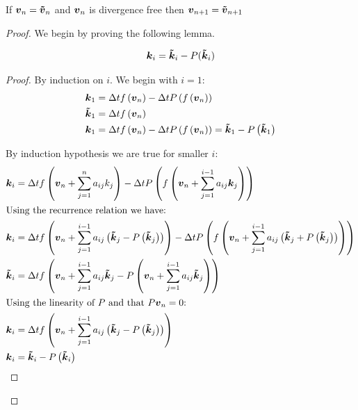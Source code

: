 \begin{theorem}
If ${\boldsymbol {v}}_{n}={\boldsymbol {\tilde{v}}}_{n}$ and ${\boldsymbol {v}}_n$ is divergence free then ${\boldsymbol {v}}_{n+1}={\boldsymbol {\tilde{v}}}_{n+1}$ 
\end{theorem}
\begin{proof}
We begin by proving the following lemma.
\begin{lemma}
\begin{equation}
  {\boldsymbol {k}}_{i}={\boldsymbol {\tilde{k}}}_{i}-P({\boldsymbol {\tilde{k}}}_{i})
\end{equation}
\end{lemma}
\begin{proof}
By induction on $i$.
We begin with $i=1$:
\begin{align}
  {\boldsymbol {k}}_{1}&=\Delta tf\left({\boldsymbol {v}}_n\right)-\Delta tP\left(f\left({\boldsymbol {v}}_n\right)\right)\\
{\boldsymbol {\tilde{k}}}_{1}&=\Delta tf\left({\boldsymbol {v}}_n\right)\\
  {\boldsymbol {k}}_{1}&=\Delta t f\left({\boldsymbol {v}}_n\right)-\Delta tP\left(f\left({\boldsymbol {v}}_n\right)\right)={\boldsymbol {\tilde{k}}}_1-P\left({\boldsymbol {\tilde{k}}}_1\right)
\end{align}

By induction hypothesis we are true for smaller $i$:
\begin{align*}
  {\boldsymbol {k}}_{i}&=\Delta tf\left({\boldsymbol {v}}_n+\sum_{j=1}^{n}a_{ij}k_{j}\right)-\Delta tP\left(f\left({\boldsymbol {v}}_n+\sum_{j=1}^{i-1}a_{ij}{\boldsymbol {k}}_{j}\right)\right)\\
  \intertext{Using the recurrence relation we have:}
  {\boldsymbol {k}}_{i}&=\Delta tf\left({\boldsymbol {v}}_n+\sum_{j=1}^{i-1}a_{ij}\left({\boldsymbol {\tilde{k}}}_{j}-P\left({\boldsymbol {\tilde{k}}}_{j}\right)\right)\right)-\Delta tP\left(f\left({\boldsymbol {v}}_n+\sum_{j=1}^{i-1}a_{ij}\left({\boldsymbol {\tilde{k}}}_{j}+P\left({\boldsymbol {\tilde{k}}}_{j}\right)\right)\right)\right)\\
  {\boldsymbol {\tilde{k}}}_{i}&=\Delta tf\left({\boldsymbol {v}}_n+\sum_{j=1}^{i-1}a_{ij}{\boldsymbol {\tilde{k}}}_{j}-P\left({\boldsymbol {v}}_n+\sum_{j=1}^{i-1}a_{ij}{\boldsymbol {\tilde{k}}}_{j}\right)\right)\\
  \intertext{Using the linearity of $P$ and that $P{\boldsymbol {v}}_{n}=0$:}
  {\boldsymbol {k}}_{i}&=\Delta tf\left({\boldsymbol {v}}_n+\sum_{j=1}^{i-1}a_{ij}\left({\boldsymbol {\tilde{k}}}_{j}-P\left({\boldsymbol {\tilde{k}}}_{j}\right)\right)\right)\\
  {\boldsymbol {k}}_{i}&={\boldsymbol {\tilde{k}}}_{i}-P\left({\boldsymbol {\tilde{k}}}_{i}\right)
\end{align*}
\end{proof}


\end{proof}
